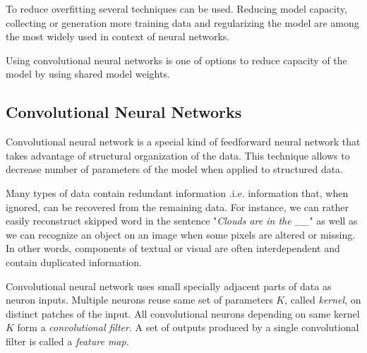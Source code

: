 To reduce overfitting several techniques can be used. Reducing model capacity, collecting or generation more training data and regularizing the model are among the most widely used in context of neural networks.

Using convolutional neural networks is one of options to reduce capacity of the model by using shared model weights.



\subsection{Convolutional Neural Networks}
\label{ch:cnn}

Convolutional neural network is a special kind of feedforward neural network that takes advantage of structural organization of the data. This technique allows to decrease number of parameters of the model when applied to structured data.

Many types of data contain redundant information .i.e. information that, when ignored, can be recovered from the remaining data.
For instance, we can rather easily reconstruct skipped word in the sentence "\textit{Clouds are in the \_\_}" as well as we can recognize an object on an image when some pixels are altered or missing.
In other words, components of textual or visual are often interdependent and contain duplicated information.

Convolutional neural network uses small specially adjacent parts of data as neuron inputs. Multiple neurons reuse same set of parameters $K$, called \textit{kernel}, on distinct patches of the input. All convolutional neurons depending on same kernel $K$ form a \textit{convolutional filter}. A set of outputs produced by a single convolutional filter is called a \textit{feature map}.



